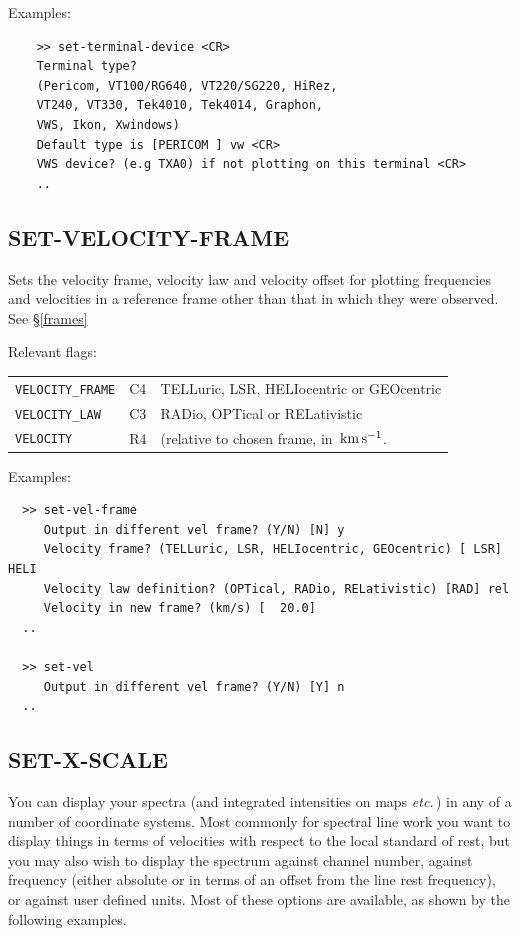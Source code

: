 \documentclass[11pt,twoside]{report}
\newcommand{\etc}{{\it etc.\,}}
\newcommand{\kms}{{\rm\,km\,s^{-1}}}
\begin{document}
Examples:
\begin{verbatim}
    >> set-terminal-device <CR>
    Terminal type?
    (Pericom, VT100/RG640, VT220/SG220, HiRez,
    VT240, VT330, Tek4010, Tek4014, Graphon,
    VWS, Ikon, Xwindows)
    Default type is [PERICOM ] vw <CR>
    VWS device? (e.g TXA0) if not plotting on this terminal <CR>
    ..
\end{verbatim}

\subsection{SET-VELOCITY-FRAME} 

Sets the velocity frame, velocity law and velocity offset for plotting
frequencies and velocities in a reference frame other than that in which
they were observed. See \S\ref{frames}

Relevant flags:\\
\begin{tabular}{lll}
   \verb+VELOCITY_FRAME+ & C4 & TELLuric, LSR, HELIocentric or GEOcentric\\
   \verb+VELOCITY_LAW+ & C3 & RADio, OPTical or RELativistic\\
   \verb+VELOCITY+ & R4 & (relative to chosen frame, in $\kms$.
\end{tabular}

Examples:
\begin{verbatim}
  >> set-vel-frame
     Output in different vel frame? (Y/N) [N] y
     Velocity frame? (TELLuric, LSR, HELIocentric, GEOcentric) [ LSR] HELI
     Velocity law definition? (OPTical, RADio, RELativistic) [RAD] rel
     Velocity in new frame? (km/s) [  20.0]
  ..

  >> set-vel
     Output in different vel frame? (Y/N) [Y] n
  ..
\end{verbatim}

\subsection{SET-X-SCALE} 

You can display your spectra (and integrated intensities on maps \etc) in
any of a number of coordinate systems. Most commonly for spectral line
work you want to display things in terms of velocities with respect to
the local standard of rest, but you may also wish to display the spectrum
against channel number, against frequency (either absolute or in terms of
an offset from the line rest frequency), or against user defined units.
Most of these options are available, as shown by the following examples.
\end{document}
